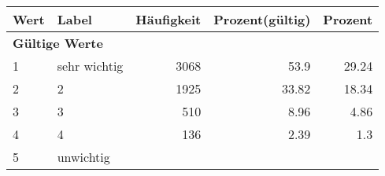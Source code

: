      \begin{longtable}{lXrrr}
     \toprule
     \textbf{Wert} & \textbf{Label} & \textbf{Häufigkeit} & \textbf{Prozent(gültig)} & \textbf{Prozent} \\
     \endhead
     \midrule
     \multicolumn{5}{l}{\textbf{Gültige Werte}}\\

     1 &
     \multicolumn{1}{X}{ sehr wichtig   } &


       \num{3068} &
       \num[round-mode=places,round-precision=2]{53,9} &
         \num[round-mode=places,round-precision=2]{29,24} \\

     2 &
     \multicolumn{1}{X}{ 2   } &


       \num{1925} &
       \num[round-mode=places,round-precision=2]{33,82} &
         \num[round-mode=places,round-precision=2]{18,34} \\

     3 &
     \multicolumn{1}{X}{ 3   } &


       \num{510} &
       \num[round-mode=places,round-precision=2]{8,96} &
         \num[round-mode=places,round-precision=2]{4,86} \\

     4 &
     \multicolumn{1}{X}{ 4   } &


       \num{136} &
       \num[round-mode=places,round-precision=2]{2,39} &
         \num[round-mode=places,round-precision=2]{1,3} \\

     5 &
     \multicolumn{1}{X}{ unwichtig   } &



\end{longtable}
